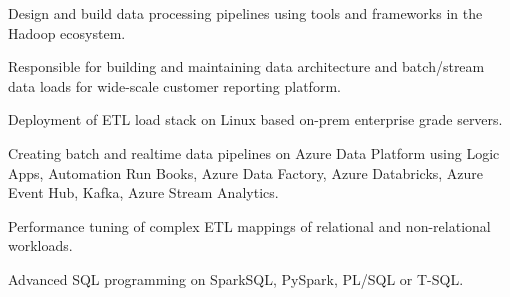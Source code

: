 \documentclass[]{deedy-resume-openfont}
\begin{document}
\begin{minipage}[t]{0.60\textwidth}
\vspace{\topsep}
\sectionsep
\begin{tightemize}
\item Design and build data processing pipelines using tools and
frameworks in the Hadoop ecosystem.
\item Responsible for building and maintaining data architecture and batch/stream data loads for wide-scale customer reporting platform.
\item Deployment of ETL load stack on Linux based on-prem enterprise grade servers.
\item Creating batch and realtime data pipelines on Azure Data Platform using Logic Apps, Automation Run Books, Azure Data Factory, Azure Databricks, Azure Event Hub, Kafka, Azure Stream Analytics. 
\item Performance tuning of complex ETL mappings of relational and non-relational workloads.
\item Advanced SQL programming on SparkSQL, PySpark, PL/SQL or T-SQL.
\end{tightemize}

\end{minipage}
\end{document}
